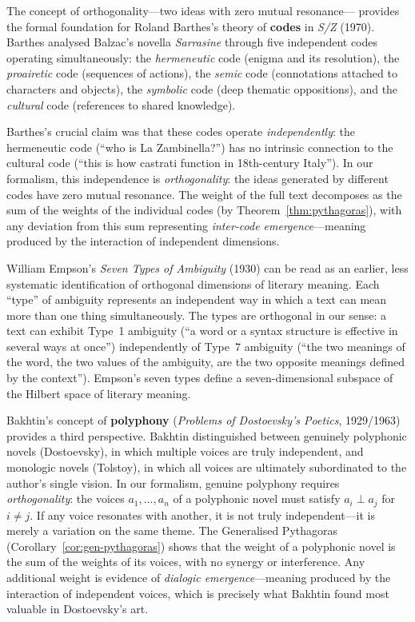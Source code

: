 \begin{interpretation}
\label{interp:ch12:barthes_codes}
The concept of orthogonality---two ideas with zero mutual resonance---
provides the formal foundation for Roland Barthes's theory of \textbf{codes}
in \emph{S/Z} (1970).  Barthes analysed Balzac's novella \emph{Sarrasine}
through five independent codes operating simultaneously: the \emph{hermeneutic}
code (enigma and its resolution), the \emph{proairetic} code (sequences of
actions), the \emph{semic} code (connotations attached to characters and
objects), the \emph{symbolic} code (deep thematic oppositions), and the
\emph{cultural} code (references to shared knowledge).

Barthes's crucial claim was that these codes operate \emph{independently}:
the hermeneutic code (``who is La Zambinella?'') has no intrinsic connection
to the cultural code (``this is how castrati function in 18th-century
Italy'').  In our formalism, this independence is \emph{orthogonality}: the
ideas generated by different codes have zero mutual resonance.  The weight
of the full text decomposes as the sum of the weights of the individual
codes (by Theorem~\ref{thm:pythagoras}), with any deviation from this sum
representing \emph{inter-code emergence}---meaning produced by the
interaction of independent dimensions.

William Empson's \emph{Seven Types of Ambiguity} (1930) can be read as an
earlier, less systematic identification of orthogonal dimensions of literary
meaning.  Each ``type'' of ambiguity represents an independent way in which a
text can mean more than one thing simultaneously.  The types are orthogonal
in our sense: a text can exhibit Type~1 ambiguity (``a word or a syntax
structure is effective in several ways at once'') independently of Type~7
ambiguity (``the two meanings of the word, the two values of the ambiguity,
are the two opposite meanings defined by the context'').  Empson's seven
types define a seven-dimensional subspace of the Hilbert space of literary
meaning.

Bakhtin's concept of \textbf{polyphony} (\emph{Problems of Dostoevsky's
Poetics}, 1929/1963) provides a third perspective.  Bakhtin distinguished
between genuinely polyphonic novels (Dostoevsky), in which multiple voices
are truly independent, and monologic novels (Tolstoy), in which all voices
are ultimately subordinated to the author's single vision.  In our formalism,
genuine polyphony requires \emph{orthogonality}: the voices $a_1, \ldots,
a_n$ of a polyphonic novel must satisfy $a_i \perp a_j$ for $i \neq j$.
If any voice resonates with another, it is not truly independent---it is
merely a variation on the same theme.  The Generalised Pythagoras
(Corollary~\ref{cor:gen-pythagoras}) shows that the weight of a polyphonic
novel is the sum of the weights of its voices, with no synergy or
interference.  Any additional weight is evidence of \emph{dialogic
emergence}---meaning produced by the interaction of independent voices, which
is precisely what Bakhtin found most valuable in Dostoevsky's art.
\end{interpretation}




